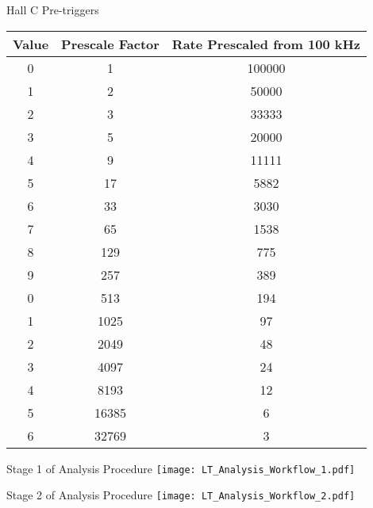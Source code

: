 \begin{Mtable}{Hall C Pre-triggers}
  \centering
  \begin{tabular}{|c|c|c|}
    \hline
    \textbf{Value} & \textbf{Prescale Factor} & \textbf{Rate Prescaled from 100 kHz} \\
    \hline    
    0   &        1 & 100000 \\
    1   &        2 & 50000 \\
    2   &        3 & 33333 \\
    3   &        5 & 20000 \\
    4   &        9 & 11111 \\
    5   &       17 & 5882 \\
    6   &       33 & 3030 \\
    7   &       65 & 1538 \\
    8   &      129 & 775 \\
    9   &      257 & 389 \\
    0   &      513 & 194 \\
    1   &     1025 & 97 \\
    2   &     2049 & 48 \\
    3   &     4097 & 24 \\
    4   &     8193 & 12 \\
    5   &    16385 & 6 \\
    6   &    32769 & 3 \\
    \hline
  \end{tabular}
  \caption{List of prescale values to their corresponding factor. The third column shows an example of a prescaled rate from 100 kHz.}
  \label{tab:2-5_prescale}
\end{Mtable}


%
%

\begin{Mfigure}{Stage 1 of Analysis Procedure}
  \centering
  \texttt{[image: LT\_Analysis\_Workflow\_1.pdf]}
  \caption{First step of the analysis workfow.}
  \label{fig:3-1_LT_Analysis_Workflow_1}
\end{Mfigure}

\begin{Mfigure}{Stage 2 of Analysis Procedure}
  \centering
  \texttt{[image: LT\_Analysis\_Workflow\_2.pdf]}
  \caption{Second step of the analysis workfow.} 
  \label{fig:3-1_LT_Analysis_Workflow_2}
\end{Mfigure}

